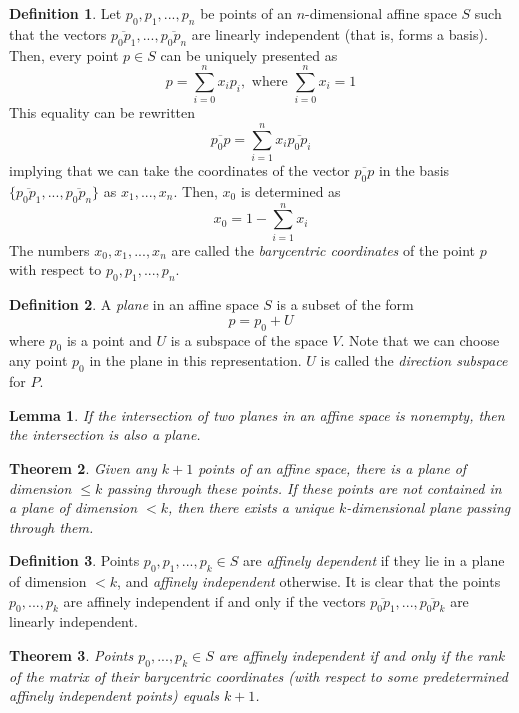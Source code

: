 \documentclass{article}
\newtheorem{theorem}{Theorem}[section]
\newtheorem{lemma}[theorem]{Lemma}
\theoremstyle{remark}
\theoremstyle{definition}
\newtheorem{definition}{Definition}[section]
\begin{document}
\begin{definition}
Let $p_0, p_1, ..., p_n$ be points of an $n$-dimensional affine space $S$ such that the vectors $\overline{p_0 p_1}, ..., \overline{p_0 p_n}$ are linearly independent (that is, forms a basis). Then, every point $p \in S$ can be uniquely presented as 
\[p = \sum_{i=0}^n x_i p_i, \text{ where } \sum_{i=0}^n x_i = 1\]
This equality can be rewritten
\[\overline{p_0 p} = \sum_{i=1}^n x_i \overline{p_0 p_i}\]
implying that we can take the coordinates of the vector $\overline{p_0 p}$ in the basis $\{ \overline{p_0 p_1}, ..., \overline{p_0 p_n}\}$ as $x_1, ..., x_n$. Then, $x_0$ is determined as 
\[x_0 = 1 - \sum_{i=1}^n x_i\]
The numbers $x_0, x_1, ..., x_n$ are called the \textit{barycentric coordinates} of the point $p$ with respect to $p_0, p_1, ..., p_n$. 
\end{definition}

\begin{definition}
A \textit{plane} in an affine space $S$ is a subset of the form 
\[p = p_0 + U\]
where $p_0$ is a point and $U$ is a subspace of the space $V$. Note that we can choose any point $p_0$ in the plane in this representation. $U$ is called the \textit{direction subspace} for $P$. 
\end{definition}

\begin{lemma}
If the intersection of two planes in an affine space is nonempty, then the intersection is also a plane. 
\end{lemma}

\begin{theorem}
Given any $k+1$ points of an affine space, there is a plane of dimension $\leq k$ passing through these points. If these points are not contained in a plane of dimension $< k$, then there exists a unique $k$-dimensional plane passing through them. 
\end{theorem}

\begin{definition}
Points $p_0, p_1, ..., p_k \in S$ are \textit{affinely dependent} if they lie in a plane of dimension $<k$, and \textit{affinely independent} otherwise. It is clear that the points $p_0,..., p_k$ are affinely independent if and only if the vectors $\overline{p_0p_1}, ..., \overline{p_0 p_k}$ are linearly independent. 
\end{definition}

\begin{theorem}
Points $p_0, ..., p_k \in S$ are affinely independent if and only if the rank of the matrix of their barycentric coordinates (with respect to some predetermined affinely independent points) equals $k+1$. 
\end{theorem}
\end{document}
